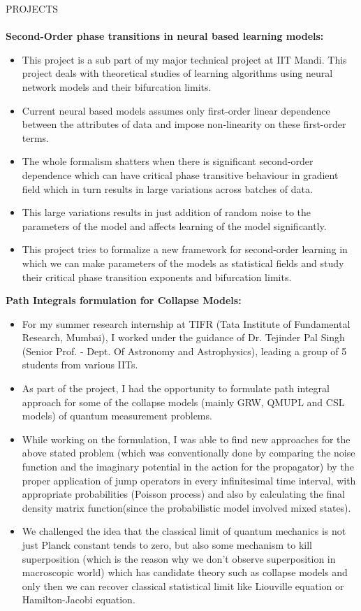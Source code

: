 \documentclass[a4paper]{article}
\newcommand{\lineunder} {
    \vspace*{-8pt} \\
    \hspace*{-18pt} \hrulefill \\
}
\newcommand{\header} [1] {
    {\hspace*{-18pt}\vspace*{6pt} \textsc{#1}}
    \vspace*{-6pt} \lineunder
}
\begin{document}
\header{PROJECTS}
\textbf{Second-Order phase transitions in neural based learning models: }\\
\begin{itemize}
    \item This project is a sub part of my major technical project at IIT Mandi. This project deals with theoretical studies of learning algorithms using neural network models and their bifurcation limits.
    \item Current neural based models assumes only first-order linear dependence between the attributes of data and impose non-linearity on these first-order terms.
    \item The whole formalism shatters when there is significant second-order dependence which can have critical phase transitive behaviour in gradient field which in turn results in large variations across batches of data.
    \item This large variations results in just addition of random noise to the parameters of the model and affects learning of the model significantly.
    \item This project tries to formalize a new framework for second-order learning in which we can make parameters of the models as statistical fields and study their critical phase transition exponents and bifurcation limits.
\end{itemize}
\vspace*{2mm}
\newpage
\textbf{Path Integrals formulation for Collapse Models: }\\
\begin{itemize}
    \item For my summer research internship at TIFR (Tata Institute of Fundamental Research, Mumbai), I worked under the guidance of Dr. Tejinder Pal Singh (Senior Prof. - Dept. Of Astronomy and Astrophysics), leading a group of 5 students from various IITs.
    \item As part of the project, I had the opportunity to formulate path integral approach for some of the collapse models (mainly GRW, QMUPL and CSL models) of quantum measurement problems.
    \item While working on the formulation, I was able to find new approaches for the above stated problem (which was conventionally done by comparing the noise function and the imaginary potential in the action for the propagator) by the proper application of jump operators in every infinitesimal time interval, with appropriate probabilities (Poisson process) and also by calculating the final density matrix function(since the probabilistic model involved mixed states).
    \item We challenged the idea that the classical limit of quantum mechanics is not just Planck constant tends to zero, but also some mechanism to kill superposition (which is the reason why we don’t observe superposition in macroscopic world) which has candidate theory such as collapse models and only then we can recover classical statistical limit like Liouville equation or Hamilton-Jacobi equation.
\end{itemize}
\end{document}
